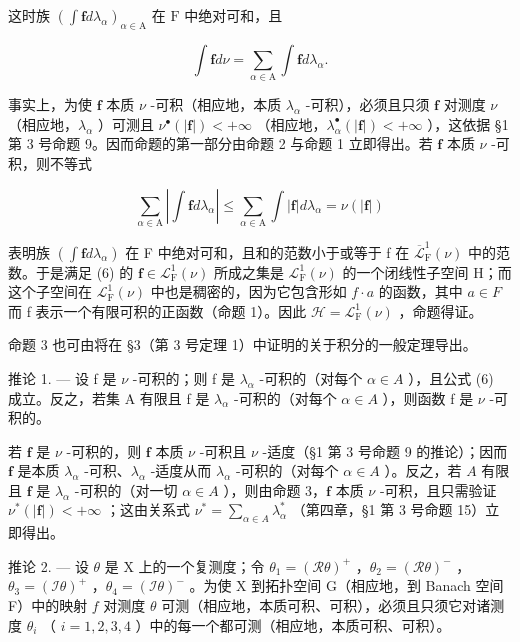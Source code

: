 这时族 \((\int \mathbf{f}d\lambda_{\alpha})_{\alpha \in \mathrm{A}}\) 在 \(\mathrm{F}\) 中绝对可和，且

\[
\int \mathbf {f} d \nu = \sum_ {\alpha \in \mathrm{A}} \int \mathbf {f} d \lambda_ {\alpha}.\tag{6}
\]

事实上，为使 \(\mathbf{f}\) 本质 \(\nu\) -可积（相应地，本质 \(\lambda_{\alpha}\) -可积），必须且只须 \(\mathbf{f}\) 对测度 \(\nu\) （相应地，\(\lambda_{\alpha}\) ）可测且 \(\nu^{\bullet}(|\mathbf{f}|) < +\infty\) （相应地，\(\lambda_{\alpha}^{\bullet}(|\mathbf{f}|) < +\infty\) ），这依据 §1 第 3 号命题 9。因而命题的第一部分由命题 2 与命题 1 立即得出。若 \(\mathbf{f}\) 本质 \(\nu\) -可积，则不等式

\[
\sum_ {\alpha \in \mathrm{A}} \left| \int \mathbf {f} d \lambda_ {\alpha} \right| \leqslant \sum_ {\alpha \in \mathrm{A}} \int | \mathbf {f} | d \lambda_ {\alpha} = \nu (| \mathbf {f} |)
\]

表明族 \(\left(\int\mathbf{f}d\lambda_{\alpha}\right)\) 在 F 中绝对可和，且和的范数小于或等于 f 在 \(\overline{\mathcal{L}}_{\mathrm{F}}^{1}(\nu)\) 中的范数。于是满足 (6) 的 \(\mathbf{f}\in\mathcal{L}_{\mathrm{F}}^{1}(\nu)\) 所成之集是 \(\mathcal{L}_{\mathrm{F}}^{1}(\nu)\) 的一个闭线性子空间 H；而这个子空间在 \(\mathcal{L}_{\mathrm{F}}^{1}(\nu)\) 中也是稠密的，因为它包含形如 \(f\cdot a\) 的函数，其中 \(a\in F\) 而 f 表示一个有限可积的正函数（命题 1）。因此 \(\mathcal{H}=\mathcal{L}_{\mathrm{F}}^{1}(\nu)\) ，命题得证。

命题 3 也可由将在 §3（第 3 号定理 1）中证明的关于积分的一般定理导出。

推论 1. --- 设 f 是 \(\nu\) -可积的；则 f 是 \(\lambda_{\alpha}\) -可积的（对每个 \(\alpha \in A\) ），且公式 (6) 成立。反之，若集 A 有限且 f 是 \(\lambda_{\alpha}\) -可积的（对每个 \(\alpha \in A\) ），则函数 f 是 \(\nu\) -可积的。

若 \(\mathbf{f}\) 是 \(\nu\) -可积的，则 \(\mathbf{f}\) 本质 \(\nu\) -可积且 \(\nu\) -适度（§1 第 3 号命题 9 的推论）；因而 \(\mathbf{f}\) 是本质 \(\lambda_{\alpha}\) -可积、\(\lambda_{\alpha}\) -适度从而 \(\lambda_{\alpha}\) -可积的（对每个 \(\alpha \in A\) ）。反之，若 \(A\) 有限且 \(\mathbf{f}\) 是 \(\lambda_{\alpha}\) -可积的（对一切 \(\alpha \in A\) ），则由命题 3，\(\mathbf{f}\) 本质 \(\nu\) -可积，且只需验证 \(\nu^{*}(|\mathbf{f}|) < +\infty\) ；这由关系式 \(\nu^{*} = \sum_{\alpha \in A} \lambda_{\alpha}^{*}\) （第四章，§1 第 3 号命题 15）立即得出。

推论 2. --- 设 \(\theta\) 是 X 上的一个复测度；令 \(\theta_1 = (\mathcal{R}\theta)^+\) ，\(\theta_2 = (\mathcal{R}\theta)^-\) ，\(\theta_3 = (\mathcal{I}\theta)^+\) ，\(\theta_4 = (\mathcal{I}\theta)^-\) 。为使 X 到拓扑空间 G（相应地，到 Banach 空间 F）中的映射 \(f\) 对测度 \(\theta\) 可测（相应地，本质可积、可积），必须且只须它对诸测度 \(\theta_i\) （ \(i = 1,2,3,4\) ）中的每一个都可测（相应地，本质可积、可积）。

